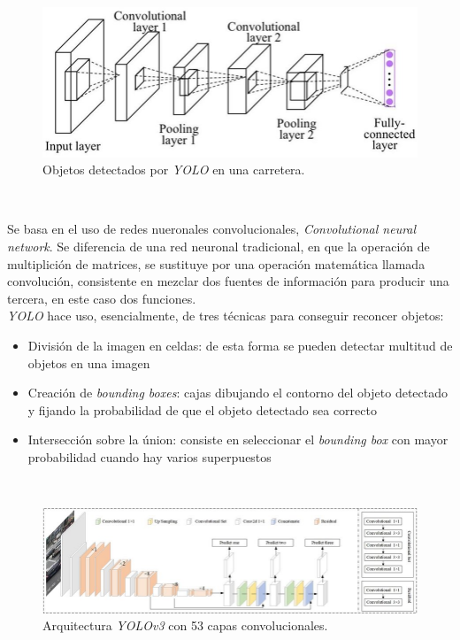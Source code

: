 \begin{figure} [h!]
	\begin{center}
		\includegraphics[width=12cm]{figs/yolo}
	\end{center}
	\caption{Objetos detectados por \textit{YOLO} en una carretera.}
	\label{fig:yolo}
\end{figure}\

Se basa en el uso de redes nueronales convolucionales, \textit{Convolutional neural network}. Se diferencia de una red neuronal tradicional, en que la operación de multiplición de matrices, se sustituye por una operación matemática llamada convolución, consistente en mezclar dos fuentes de información para producir una tercera, en este caso dos funciones.\\

\textit{YOLO} hace uso, esencialmente, de tres técnicas para conseguir reconcer objetos:\\
\begin{itemize}
	\item División de la imagen en celdas: de esta forma se pueden detectar multitud de objetos en una imagen
	\item Creación de \textit{bounding boxes}: cajas dibujando el contorno del objeto detectado y fijando la probabilidad de que el objeto detectado sea correcto
	\item Intersección sobre la únion: consiste en seleccionar el \textit{bounding box} con mayor probabilidad cuando hay varios superpuestos
\end{itemize}\

\begin{figure} [h!]
	\begin{center}
		\includegraphics[width=16cm]{figs/yolov353}
	\end{center}
	\caption{Arquitectura \textit{YOLOv3} con 53 capas convolucionales.}
	\label{fig:yololayers}
\end{figure}\

